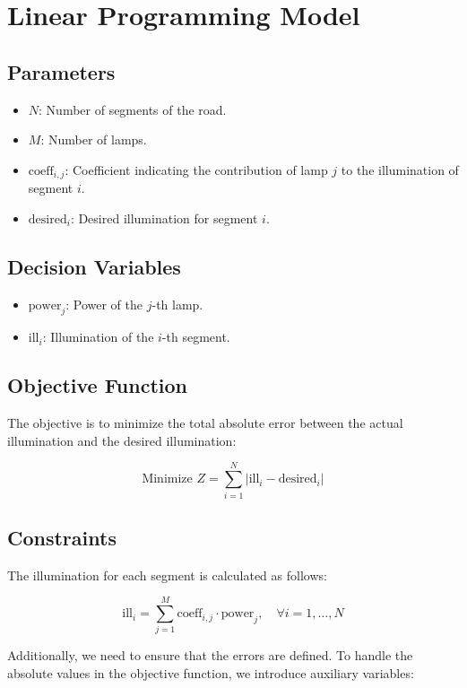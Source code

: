 \documentclass{article}
\begin{document}
\section*{Linear Programming Model}

\subsection*{Parameters}
\begin{itemize}
    \item \( N \): Number of segments of the road.
    \item \( M \): Number of lamps.
    \item \( \text{coeff}_{i,j} \): Coefficient indicating the contribution of lamp \( j \) to the illumination of segment \( i \).
    \item \( \text{desired}_i \): Desired illumination for segment \( i \).
\end{itemize}

\subsection*{Decision Variables}
\begin{itemize}
    \item \( \text{power}_j \): Power of the \( j \)-th lamp.
    \item \( \text{ill}_i \): Illumination of the \( i \)-th segment.
\end{itemize}

\subsection*{Objective Function}
The objective is to minimize the total absolute error between the actual illumination and the desired illumination:

\[
\text{Minimize } Z = \sum_{i=1}^{N} | \text{ill}_i - \text{desired}_i |
\]

\subsection*{Constraints}
The illumination for each segment is calculated as follows:

\[
\text{ill}_i = \sum_{j=1}^{M} \text{coeff}_{i,j} \cdot \text{power}_j, \quad \forall i = 1, \ldots, N
\]

Additionally, we need to ensure that the errors are defined. To handle the absolute values in the objective function, we introduce auxiliary variables:
\end{document}
